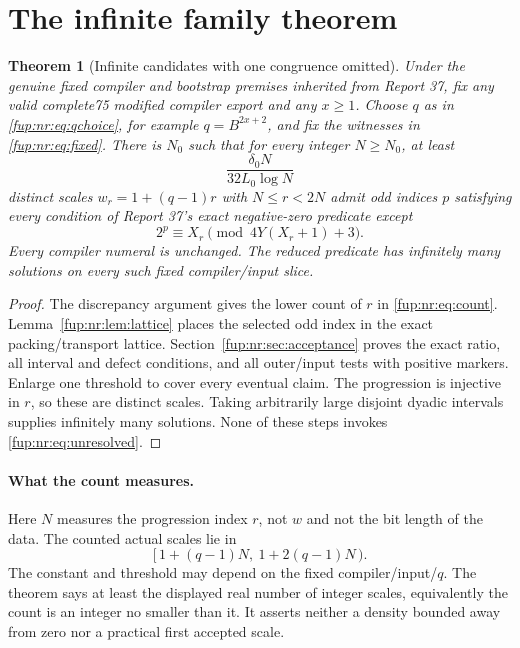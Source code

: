 \documentclass[11pt,letterpaper]{article}
\newtheorem{theorem}{Theorem}[section]
\theoremstyle{definition}\newtheorem{definition}[theorem]{Definition}
\theoremstyle{remark}\newtheorem{remark}[theorem]{Remark}
\begin{document}
\section{The infinite family theorem}\label{fup:nr:sec:theorem}
\begin{theorem}[Infinite candidates with one congruence omitted]\label{fup:nr:thm:family}
Under the genuine fixed compiler and bootstrap premises inherited from Report 37, fix any valid complete75 modified compiler export and any $x\ge1$. Choose $q$ as in \eqref{fup:nr:eq:qchoice}, for example $q=B^{2x+2}$, and fix the witnesses in \eqref{fup:nr:eq:fixed}. There is $N_0$ such that for every integer $N\ge N_0$, at least
\[
 \frac{\delta_0N}{32L_0\log N}
\]
distinct scales $w_r=1+(q-1)r$ with $N\le r<2N$ admit odd indices $p$ satisfying every condition of Report 37's exact negative-zero predicate except
\begin{equation}\label{fup:nr:eq:unresolved}
 2^p\equiv X_r\pmod{4Y(X_r+1)+3}.
\end{equation}
Every compiler numeral is unchanged. The reduced predicate has infinitely many solutions on every such fixed compiler/input slice.
\end{theorem}
\begin{proof}
The discrepancy argument gives the lower count of $r$ in \eqref{fup:nr:eq:count}. Lemma~\ref{fup:nr:lem:lattice} places the selected odd index in the exact packing/transport lattice. Section~\ref{fup:nr:sec:acceptance} proves the exact ratio, all interval and defect conditions, and all outer/input tests with positive markers. Enlarge one threshold to cover every eventual claim. The progression is injective in $r$, so these are distinct scales. Taking arbitrarily large disjoint dyadic intervals supplies infinitely many solutions. None of these steps invokes \eqref{fup:nr:eq:unresolved}.
\end{proof}

\paragraph{What the count measures.}
Here $N$ measures the progression index $r$, not $w$ and not the bit length of the data. The counted actual scales lie in
\[
 [\,1+(q-1)N,\ 1+2(q-1)N\,).
\]
The constant and threshold may depend on the fixed compiler/input/$q$. The theorem says at least the displayed real number of integer scales, equivalently the count is an integer no smaller than it. It asserts neither a density bounded away from zero nor a practical first accepted scale.
\end{document}
